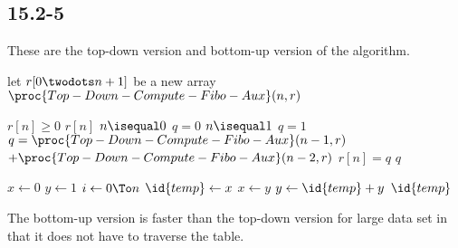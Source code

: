 \subsection{15.2-5}
    These are the top-down version and bottom-up version of the algorithm.
    \begin{codebox}
        \li let $r[0\twodots n+1]$ be a new array
        \li $\proc{Top-Down-Compute-Fibo-Aux}(n, r)$
    \end{codebox}
    \begin{codebox}
        \li \If $r[n] \ge 0$
            \Then
        \li     \Return $r[n]$
            \End
        \li \If $n \isequal 0$
            \Then
        \li     $q = 0$
        \li \ElseIf $n \isequal 1$
            \Then
        \li     $q = 1$
        \li \Else 
        \li     $q = \proc{Top-Down-Compute-Fibo-Aux}(n-1, r)$
        \zi     $+ \proc{Top-Down-Compute-Fibo-Aux}(n-2, r)$
            \End
        \li $r[n] = q$
        \li \Return $q$
    \end{codebox}
    \begin{codebox}
        \li $x \gets 0$
        \li $y \gets 1$
        \li \For $i \gets 0 \To n$
            \Do
        \li     $\id{temp}\gets x$
        \li     $x \gets y$
        \li     $y \gets \id{temp}+y$
            \End
        \li \Return $\id{temp}$
    \end{codebox}
    The bottom-up version is faster than the top-down version for large data
    set in that it does not have to traverse the table.
